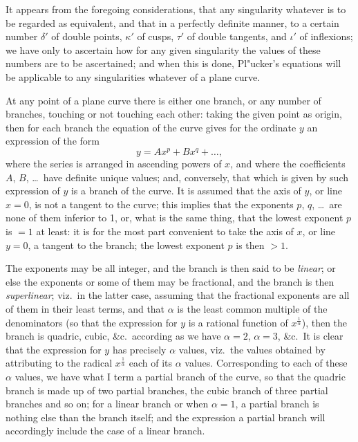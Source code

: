 \documentclass[11pt,a4paper]{article}
\begin{document}
It appears from the foregoing considerations, that any singularity whatever is to be regarded as equivalent, and that in a perfectly definite manner, to a certain number $\delta'$ of double points, $\kappa'$ of cusps, $\tau'$ of double tangents, and $\iota'$ of inflexions; we have only to ascertain how for any given singularity the values of these numbers are to be ascertained; and when this is done, Pl"{u}cker's equations will be applicable to any singularities whatever of a plane curve.

At any point of a plane curve there is either one branch, or any number of branches, touching or not touching each other: taking the given point as origin, then for each branch the equation of the curve gives for the ordinate $y$ an expression of the form
\[
y = Ax^{p} + Bx^{q} + \ldots,
\]
where the series is arranged in ascending powers of $x$, and where the coefficients $A$, $B$, \ldots\ have definite unique values; and, conversely, that which is given by such expression of $y$ is a branch of the curve. It is assumed that the axis of $y$, or line $x = 0$, is not a tangent to the curve; this implies that the exponents $p$, $q$, \ldots\ are none of them inferior to 1, or, what is the same thing, that the lowest exponent $p$ is $= 1$ at least: it is for the most part convenient to take the axis of $x$, or line $y = 0$, a tangent to the branch; the lowest exponent $p$ is then $> 1$.

The exponents may be all integer, and the branch is then said to be \textit{linear}; or else the exponents or some of them may be fractional, and the branch is then \textit{superlinear}; viz.~in the latter case, assuming that the fractional exponents are all of them in their least terms, and that $\alpha$ is the least common multiple of the denominators (so that the expression for $y$ is a rational function of $x^{\frac{1}{\alpha}}$), then the branch is quadric, cubic, \&c.\ according as we have $\alpha = 2$, $\alpha = 3$, \&c.\ It is clear that the expression for $y$ has precisely $\alpha$ values, viz.~the values obtained by attributing to the radical $x^{\frac{1}{\alpha}}$ each of its $\alpha$ values. Corresponding to each of these $\alpha$ values, we have what I term a partial branch of the curve, so that the quadric branch is made up of two partial branches, the cubic branch of three partial branches and so on; for a linear branch or when $\alpha = 1$, a partial branch is nothing else than the branch itself; and the expression a partial branch will accordingly include the case of a linear branch.
\end{document}
